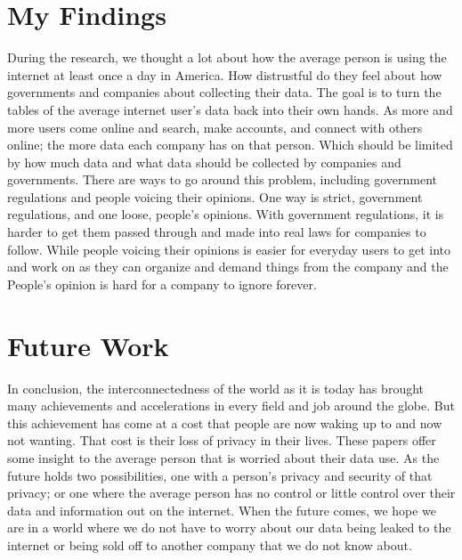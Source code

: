 \documentclass[10.5pt, twoside,twocolumn]{article}
\begin{document}





\section{My Findings}
During the research, we thought a lot about how the average person is using the internet at least once a day in America. How distrustful do they feel about how governments and companies about collecting their data. The goal is to turn the tables of the average internet user's data back into their own hands. As more and more users come online and search, make accounts, and connect with others online; the more data each company has on that person. Which should be limited by how much data and what data should be collected by companies and governments. There are ways to go around this problem, including government regulations and people voicing their opinions. One way is strict, government regulations, and one loose, people's opinions. With government regulations, it is harder to get them passed through and made into real laws for companies to follow. While people voicing their opinions is easier for everyday users to get into and work on as they can organize and demand things from the company and the People's opinion is hard for a company to ignore forever.


\section{Future Work}
In conclusion, the interconnectedness of the world as it is today has brought many achievements and accelerations in every field and job around the globe. But this achievement has come at a cost that people are now waking up to and now not wanting. That cost is their loss of privacy in their lives. These papers offer some insight to the average person that is worried about their data use. As the future holds two possibilities, one with a person's privacy and security of that privacy; or one where the average person has no control or little control over their data and information out on the internet. When the future comes, we hope we are in a world where we do not have to worry about our data being leaked to the internet or being sold off to another company that we do not know about.


\printbibliography %

\end{document}
